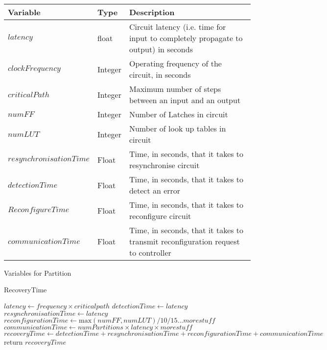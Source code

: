 \documentclass[12pt,draft,oneside]{article} %
\begin{document}
\begin{algorithm}
    \begin{center}
        \begin{tabularx}{\linewidth}{llX}
        \toprule
        Variable & Type & Description\\
        \midrule
        $latency$ & float & Circuit latency (i.e. time for input to completely propagate to output) in seconds\\
        $clockFrequency$ & Integer & Operating frequency of the circuit, in seconds\\
        $criticalPath$ & Integer & Maximum number of steps between an input and an output\\
        $numFF$ & Integer & Number of Latches in circuit\\
        $numLUT$ & Integer & Number of look up tables in circuit\\
        $resynchronisationTime$ & Float & Time, in seconds, that it takes to resynchronise circuit\\
        $detectionTime$ & Float & Time, in seconds, that it takes to detect an error\\
        $ReconfigureTime$ & Float & Time, in seconds, that it takes to reconfigure circuit\\
        $communicationTime$ & Float & Time, in seconds, that it takes to transmit reconfiguration request to controller\\
        \bottomrule
        \end{tabularx}
        \caption{Variables for Partition}
        \label{varPart}
    \end{center}
   \caption{RecoveryTime}\label{main}
   \begin{algorithmic}[1]
            \State $latency \gets frequency\times{}criticalpath$
            \State $detectionTime \gets latency$
            \State $resynchronisationTime \gets latency$
            \State $reconfigurationTime \gets \mbox{max}(numFF, numLUT)/10/15...more stuff$
            \State $communicationTime \gets numPartitions\times{}latency\times{}more stuff$
            \State $recoveryTime \gets detectionTime+resynchronisationTime+reconfigurationTime+communicationTime$
            \State return $recoveryTime$
         \EndProcedure
   \end{algorithmic}
\end{algorithm}

\newpage
\end{document}
